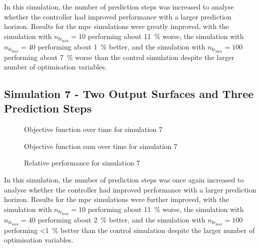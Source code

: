 \documentclass[conference]{IEEEtran}
\begin{document}
In this simulation, the number of prediction steps was increased to analyse whether the controller had improved performance with a larger prediction horizon.
Results for the \gls{mpc} simulations were greatly improved, with the simulation with $n_{\text{fe}_{\text{max}}} = 10$ performing about \SI{11}{\percent} worse, the simulation with $n_{\text{fe}_{\text{max}}} = 40$ performing about \SI{1}{\percent} better, and the simulation with $n_{\text{fe}_{\text{max}}} = 100$ performing about \SI{7}{\percent} worse than the control simulation despite the larger number of optimisation variables.

\subsection{Simulation 7 - Two Output Surfaces and Three Prediction Steps} \label{subsec:results_SS07}

\begin{figure}[h]
    \centering
    
    \caption{Objective function over time for simulation 7}
    \label{fig:SS07_obj_hist}
\end{figure}

%     

\begin{figure}[h]
    \centering
    
    \caption{Objective function sum over time for simulation 7}
    \label{fig:SS07_s_obj_hist}
\end{figure}

\begin{figure}[h]
    \centering
    
    \caption{Relative performance for simulation 7}
    \label{fig:SS07_s_obj_rel}
\end{figure}

In this simulation, the number of prediction steps was once again increased to analyse whether the controller had improved performance with a larger prediction horizon.
Results for the \gls{mpc} simulations were further improved, with the simulation with $n_{\text{fe}_{\text{max}}} = 10$ performing about \SI{11}{\percent} worse, the simulation with $n_{\text{fe}_{\text{max}}} = 40$ performing about \SI{2}{\percent} better, and the simulation with $n_{\text{fe}_{\text{max}}} = 100$ performing <\SI{1}{\percent} better than the control simulation despite the larger number of optimisation variables.
\end{document}
